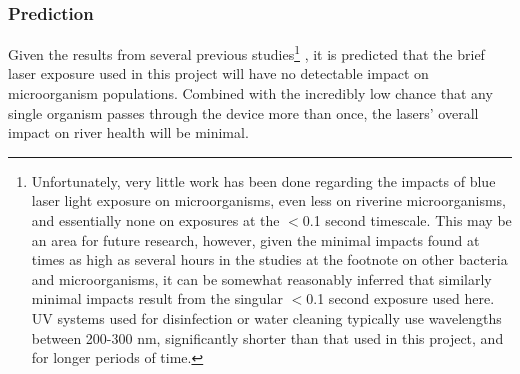\documentclass[fleqn,10pt]{SelfArx} %
\begin{document}
	\subsubsection{Prediction}
	Given the results from several previous studies\footnote{Unfortunately, very little work has been done regarding the impacts of blue laser light exposure on microorganisms, even less on riverine microorganisms, and essentially none on exposures at the $<$0.1 second timescale. This may be an area for future research, however, given the minimal impacts found at times as high as several hours in the studies at the footnote on other bacteria and microorganisms, it can be somewhat reasonably inferred that similarly minimal impacts result from the singular $<$0.1 second exposure used here. UV systems used for disinfection or water cleaning typically use wavelengths between 200-300 nm, significantly shorter than that used in this project, and for longer periods of time.} \cite{Dai_Gupta_Murray_Vrahas_Tegos_Hamblin_2012} \cite{lightExposure} \cite{Gorai_Katayama_Obata_Murata_Taguchi_2014} \cite{lightExposure2},  it is predicted that the brief laser exposure used in this project will have no detectable impact on microorganism populations. Combined with the incredibly low chance that any single organism passes through the device more than once, the lasers' overall impact on river health will be minimal.
\end{document}
